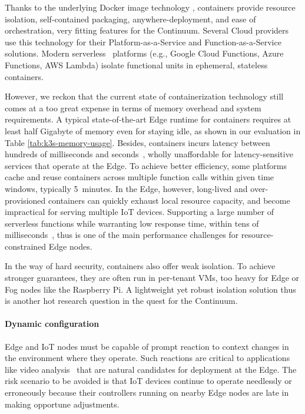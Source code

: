 Thanks to the underlying Docker image technology \cite{docker-image}, containers provide resource isolation, self-contained packaging, anywhere-deployment, and ease of orchestration, very fitting features for the Continuum.
Several Cloud providers use this technology for their Platform-as-a-Service and Function-as-a-Service solutions. Modern serverless~\cite{jonas2019cloud} platforms (e.g., Google Cloud Functions, Azure Functions, AWS Lambda) isolate functional units in ephemeral, stateless containers. 

However, we reckon that the current state of containerization technology still comes at a too great expense in terms of memory overhead and system requirements. A typical state-of-the-art Edge runtime for containers requires at least half Gigabyte of memory even for staying idle, as shown in our evaluation in Table \ref{tab:k3s-memory-usage}.
Besides, containers incurs latency between hundreds of milliseconds and seconds~\cite{mohanty2018evaluation}, wholly unaffordable for latency-sensitive services that operate at the Edge. 
To achieve better efficiency, some platforms cache and reuse containers across multiple function calls within given time windows, typically 5~minutes. 
In the Edge, however, long-lived and over-provisioned containers can quickly exhaust local resource capacity, and become impractical for serving multiple IoT devices. 
Supporting a large number of serverless functions while warranting low response time, within tens of milliseconds~\cite{elbamby2019wireless}, thus is one of the main performance challenges for resource-constrained Edge nodes.

In the way of hard security, containers also offer weak isolation. To achieve stronger guarantees, they are often run in per-tenant VMs, too heavy for Edge or Fog nodes like the Raspberry Pi. 
A light\-weight yet robust isolation solution thus is another hot research question in the quest for the Continuum.

\paragraph{Dynamic configuration}

Edge and IoT nodes must be capable of prompt reaction to context changes in the environment where they operate. 
Such reactions are critical to applications like video analysis~\cite{jang2018application} that are natural candidates for deployment at the Edge. 
The risk scenario to be avoided is that IoT devices continue to operate needlessly or erroneously because their controllers running on nearby Edge nodes are late in making opportune adjustments.

